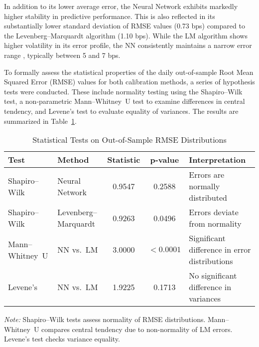 In addition to its lower average error, the Neural Network exhibits markedly higher stability in predictive performance. This is also reflected in its substantially lower standard deviation of RMSE values (0.73 bps) compared to the Levenberg–Marquardt algorithm (1.10 bps). While the LM algorithm shows higher volatility in its error profile, the NN consistently maintains a narrow error range , typically between 5 and 7 bps.

To formally assess the statistical properties of the daily out-of-sample Root Mean Squared Error (RMSE) values for both calibration methods, a series of hypothesis tests were conducted. These include normality testing using the Shapiro–Wilk test, a non-parametric Mann–Whitney~U test to examine differences in central tendency, and Levene’s test to evaluate equality of variances. The results are summarized in Table~\ref{tab:stat_tests}.

\begin{table}[htbp]
	\centering
	\begin{threeparttable}
		\caption{Statistical Tests on Out-of-Sample RMSE Distributions}
		\label{tab:stat_tests}
		\begin{tabular}{lp{2.5cm}ccp{3.5cm}}
			\toprule
			\textbf{Test}   & \textbf{Method}      & \textbf{Statistic} & \textbf{p-value} & \textbf{Interpretation}                       \\
			\midrule
			Shapiro--Wilk   & Neural Network       & 0.9547             & 0.2588           & Errors are normally distributed               \\
			Shapiro--Wilk   & Levenberg--Marquardt & 0.9263             & 0.0496           & Errors deviate from normality                 \\
			Mann--Whitney~U & NN vs.\ LM           & 3.0000             & $<0.0001$        & Significant difference in error distributions \\
			Levene’s        & NN vs.\ LM           & 1.9225             & 0.1713           & No significant difference in variances        \\
			\bottomrule
		\end{tabular}
		\begin{tablenotes}
			\footnotesize
			\item \textit{Note:} Shapiro--Wilk tests assess normality of RMSE distributions. Mann--Whitney~U compares central tendency due to non-normality of LM errors. Levene’s test checks variance equality.
		\end{tablenotes}
	\end{threeparttable}
\end{table}

